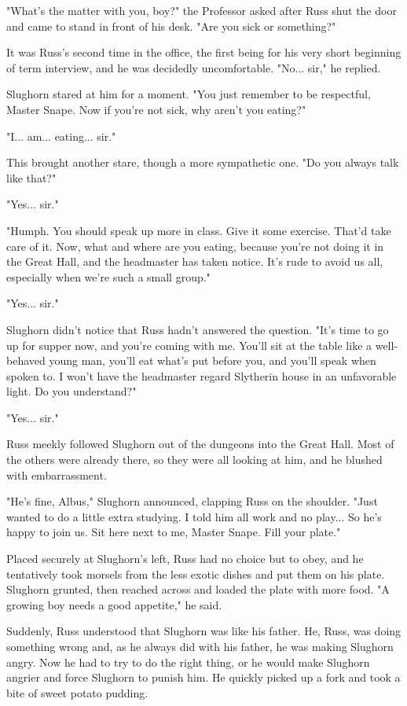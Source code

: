 \documentclass[a4paper,11pt]{article}
\begin{document}
"What's the matter with you, boy?" the Professor asked after Russ shut the door and came to stand in front of his desk. "Are you sick or something?"

It was Russ's second time in the office, the first being for his very short beginning of term interview, and he was decidedly uncomfortable. "No... sir," he replied.

Slughorn stared at him for a moment. "You just remember to be respectful, Master Snape. Now if you're not sick, why aren't you eating?"

"I... am... eating... sir."

This brought another stare, though a more sympathetic one. "Do you always talk like that?"

"Yes... sir."

"Humph. You should speak up more in class. Give it some exercise. That'd take care of it. Now, what and where are you eating, because you're not doing it in the Great Hall, and the headmaster has taken notice. It's rude to avoid us all, especially when we're such a small group."

"Yes... sir."

Slughorn didn't notice that Russ hadn't answered the question. "It's time to go up for supper now, and you're coming with me. You'll sit at the table like a well-behaved young man, you'll eat what's put before you, and you'll speak when spoken to. I won't have the headmaster regard Slytherin house in an unfavorable light. Do you understand?"

"Yes... sir."

Russ meekly followed Slughorn out of the dungeons into the Great Hall. Most of the others were already there, so they were all looking at him, and he blushed with embarrassment.

"He's fine, Albus," Slughorn announced, clapping Russ on the shoulder. "Just wanted to do a little extra studying. I told him all work and no play... So he's happy to join us. Sit here next to me, Master Snape. Fill your plate."

Placed securely at Slughorn's left, Russ had no choice but to obey, and he tentatively took morsels from the less exotic dishes and put them on his plate. Slughorn grunted, then reached across and loaded the plate with more food. "A growing boy needs a good appetite," he said.

Suddenly, Russ understood that Slughorn was like his father. He, Russ, was doing something wrong and, as he always did with his father, he was making Slughorn angry. Now he had to try to do the right thing, or he would make Slughorn angrier and force Slughorn to punish him. He quickly picked up a fork and took a bite of sweet potato pudding.
\end{document}
